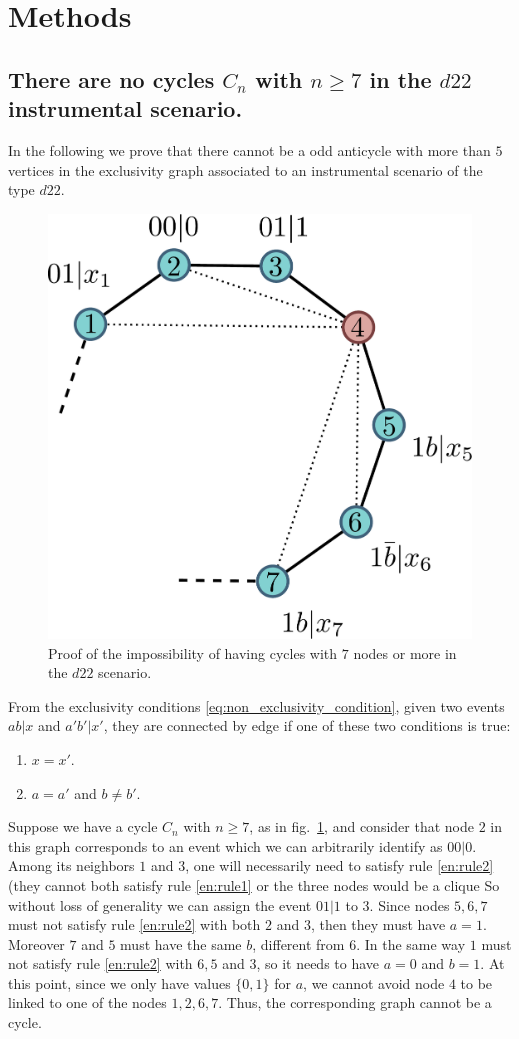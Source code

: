 \documentclass[letterpaper]{article}
\begin{document}
\section*{Methods}
\subsection*{There are no cycles $C_n$ with $n \ge 7$ in the $d22$ instrumental scenario.}
In the following we prove that there cannot be a odd anticycle with more than
$5$ vertices in the exclusivity graph associated to an instrumental scenario of
the type $d22$.

\begin{figure}[h]
    \centering
    \includegraphics[width=.6\columnwidth]{images/cycle_proof.pdf}
    \caption{Proof of the impossibility of having cycles with $7$ nodes or more
    in the $d22$ scenario.}
    \label{fig:cycle_graph_proof}
\end{figure}

From the exclusivity conditions \eqref{eq:non_exclusivity_condition},
given two events $ab|x$ and $a'b'|x'$, they are connected by edge if one of these two conditions is true:
\begin{enumerate}
    \item $x=x'$.\label{en:rule1}
    \item $a=a'$ and $b \neq b'$.\label{en:rule2}
\end{enumerate}
Suppose we have a cycle $C_n$ with $n \ge 7$, as in fig.~\ref{fig:cycle_graph_proof},
and consider that node $2$ in this graph corresponds to an event which we can arbitrarily identify as $00|0$.
Among its neighbors $1$ and $3$, one will necessarily need to satisfy rule
\ref{en:rule2} (they cannot both satisfy rule \ref{en:rule1} or the three nodes
would be a clique 
So without loss of generality we can assign the event $01|1$ to $3$.
Since nodes $5,6,7$ must not satisfy rule \ref{en:rule2} with both $2$ and $3$, then they must have $a = 1$.
Moreover $7$ and $5$ must have the same $b$, different from $6$. In the same way $1$ must not satisfy rule \ref{en:rule2} with $6,5$ and $3$, so it
needs to have $a=0$ and $b=1$. At this point, since we only have values
$\{0,1\}$ for $a$, we cannot avoid node $4$ to be linked to one of the nodes
$1,2,6,7$. Thus, the corresponding graph cannot be a cycle.
\end{document}
